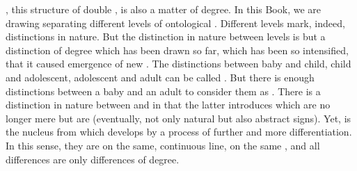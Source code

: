 \pa {}, this structure of double , is also a
matter of degree.  In this Book, we are drawing  separating
different levels of ontological .  Different levels mark, indeed,
distinctions in nature.  But the distinction in nature between levels is but a
distinction of degree which has been drawn so far, which has been so
intensified, that it caused emergence of new . The distinctions
between baby and child, child and adolescent, adolescent and adult can be called
. But there is enough distinctions between a baby and
an adult to consider them as . There is a distinction in
nature between  and  in that the latter
introduces  which are no longer mere  but are  (eventually, not only natural but also abstract signs). Yet,
 is the nucleus from which  develops by a process
of further and more  differentiation.  In this sense, they are on
the same, continuous line, on the same , and all differences are only
differences of degree.

